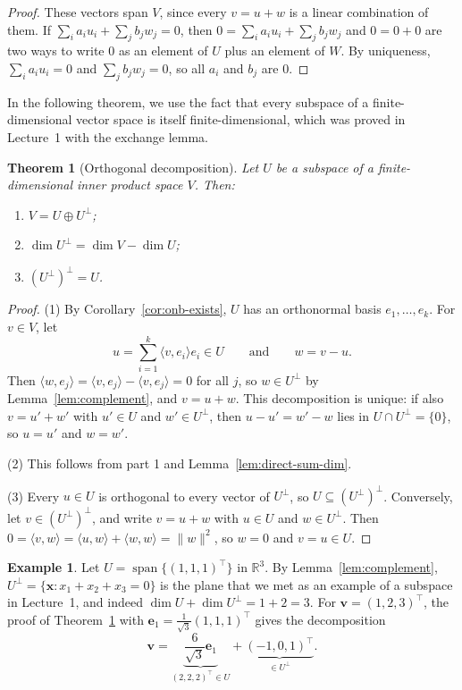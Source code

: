 \documentclass[11pt]{article}
\newcommand{\norm}[1]{\lVert #1 \rVert}
\newcommand{\ip}[2]{\langle #1, #2 \rangle}
\theoremstyle{definition}
\newtheorem{example}[definition]{Example}
\theoremstyle{plain}
\newtheorem{theorem}[definition]{Theorem}
\theoremstyle{remark}
\DeclareMathOperator{\Span}{span}
\begin{document}
\begin{proof}
    These vectors span $V$, since every $v = u + w$ is a linear combination of them. If $\sum_i a_i u_i + \sum_j b_j w_j = 0$, then $0 = \sum_i a_i u_i + \sum_j b_j w_j$ and $0 = 0 + 0$ are two ways to write $0$ as an element of $U$ plus an element of $W$. By uniqueness, $\sum_i a_i u_i = 0$ and $\sum_j b_j w_j = 0$, so all $a_i$ and $b_j$ are $0$.
\end{proof}

In the following theorem, we use the fact that every subspace of a finite-dimensional vector space is itself finite-dimensional, which was proved in Lecture~1 with the exchange lemma.

\begin{theorem}[Orthogonal decomposition]\label{thm:orth-decomposition}
    Let $U$ be a subspace of a finite-dimensional inner product space $V$. Then:
    \begin{enumerate}
        \item $V = U \oplus U^\perp$;
        \item $\dim U^\perp = \dim V - \dim U$;
        \item $(U^\perp)^\perp = U$.
    \end{enumerate}
\end{theorem}

\begin{proof}
    (1) By Corollary~\ref{cor:onb-exists}, $U$ has an orthonormal basis $e_1, \ldots, e_k$. For $v \in V$, let
    \[u = \sum_{i=1}^k \ip{v}{e_i} e_i \in U \qquad \text{and} \qquad w = v - u.\]
    Then $\ip{w}{e_j} = \ip{v}{e_j} - \ip{v}{e_j} = 0$ for all $j$, so $w \in U^\perp$ by Lemma~\ref{lem:complement}, and $v = u + w$. This decomposition is unique: if also $v = u' + w'$ with $u' \in U$ and $w' \in U^\perp$, then $u - u' = w' - w$ lies in $U \cap U^\perp = \{0\}$, so $u = u'$ and $w = w'$.

    (2) This follows from part 1 and Lemma~\ref{lem:direct-sum-dim}.

    (3) Every $u \in U$ is orthogonal to every vector of $U^\perp$, so $U \subseteq (U^\perp)^\perp$. Conversely, let $v \in (U^\perp)^\perp$, and write $v = u + w$ with $u \in U$ and $w \in U^\perp$. Then $0 = \ip{v}{w} = \ip{u}{w} + \ip{w}{w} = \norm{w}^2$, so $w = 0$ and $v = u \in U$.
\end{proof}

\begin{example}\label{ex:complement-line}
    Let $U = \Span\{(1, 1, 1)^\top\}$ in $\mathbb{R}^3$. By Lemma~\ref{lem:complement}, $U^\perp = \{\mathbf{x} : x_1 + x_2 + x_3 = 0\}$ is the plane that we met as an example of a subspace in Lecture~1, and indeed $\dim U + \dim U^\perp = 1 + 2 = 3$. For $\mathbf{v} = (1, 2, 3)^\top$, the proof of Theorem~\ref{thm:orth-decomposition} with $\mathbf{e}_1 = \frac{1}{\sqrt{3}}(1, 1, 1)^\top$ gives the decomposition
    \[\mathbf{v} = \underbrace{\frac{6}{\sqrt{3}} \mathbf{e}_1}_{(2, 2, 2)^\top \in U} + \underbrace{(-1, 0, 1)^\top}_{\in U^\perp}.\]
\end{example}
\end{document}
